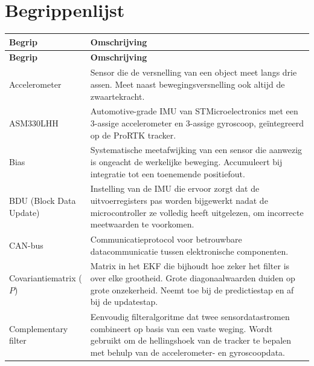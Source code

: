 \section{Begrippenlijst}
\label{app:begrippenlijst}

\renewcommand{\arraystretch}{1.4}
\begin{longtable}{p{4.5cm} p{10cm}}
    \rowcolor{green!20}
    \textbf{Begrip} & \textbf{Omschrijving} \\
    \hline
    \endfirsthead

    \rowcolor{green!20}
    \textbf{Begrip} & \textbf{Omschrijving} \\
    \hline
    \endhead

    Accelerometer &
    Sensor die de versnelling van een object meet langs drie assen.
    Meet naast bewegingsversnelling ook altijd de zwaartekracht. \\

    ASM330LHH &
    Automotive-grade IMU van STMicroelectronics met een 3-assige
    accelerometer en 3-assige gyroscoop, geïntegreerd op de
    ProRTK tracker. \\

    Bias &
    Systematische meetafwijking van een sensor die aanwezig is
    ongeacht de werkelijke beweging. Accumuleert bij integratie
    tot een toenemende positiefout. \\

    BDU (Block Data Update) &
    Instelling van de IMU die ervoor zorgt dat de uitvoerregisters
    pas worden bijgewerkt nadat de microcontroller ze volledig
    heeft uitgelezen, om incorrecte meetwaarden te voorkomen. \\

    CAN-bus &
    Communicatieprotocol voor betrouwbare datacommunicatie tussen
    elektronische componenten. \\

    Covariantiematrix ($P$) &
    Matrix in het EKF die bijhoudt hoe zeker het filter is over
    elke grootheid. Grote diagonaalwaarden duiden op grote
    onzekerheid. Neemt toe bij de predictiestap en af bij
    de updatestap. \\

    Complementary filter &
    Eenvoudig filteralgoritme dat twee sensordatastromen combineert
    op basis van een vaste weging. Wordt gebruikt om de
    hellingshoek van de tracker te bepalen met behulp van de
    accelerometer- en gyroscoopdata. \\


\end{longtable}
